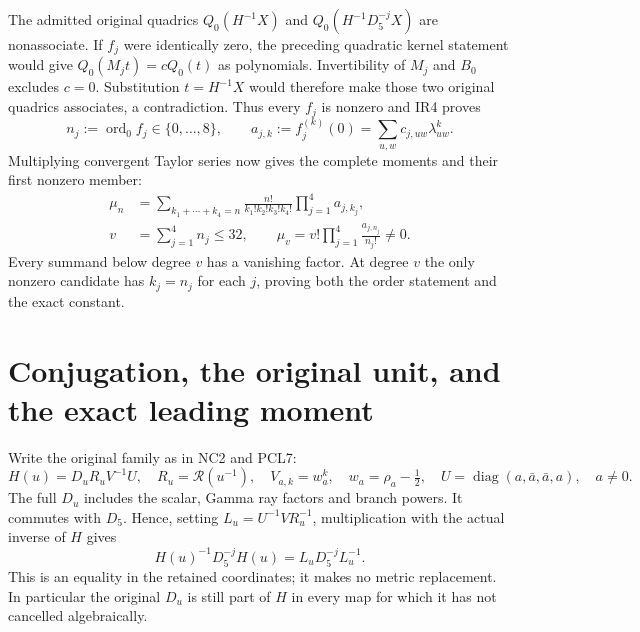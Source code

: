 \documentclass[11pt]{article}
\newcommand{\diag}{\operatorname{diag}}
\newcommand{\ord}{\operatorname{ord}}
\begin{document}
The admitted original quadrics
$Q_0(H^{-1}X)$ and $Q_0(H^{-1}D_5^{-j}X)$ are nonassociate. If $f_j$
were identically zero, the preceding quadratic kernel statement would
give $Q_0(M_jt)=cQ_0(t)$ as polynomials. Invertibility of $M_j$ and
$B_0$ excludes $c=0$. Substitution $t=H^{-1}X$ would therefore make
those two original quadrics associates, a contradiction. Thus every
$f_j$ is nonzero and IR4 proves
\[
 n_j:=\ord_0f_j\in\{0,\ldots,8\},\qquad
 a_{j,k}:=f_j^{(k)}(0)=\sum_{u,w}c_{j,uw}\lambda_{uw}^k.
 \tag{IR5}
\]
Multiplying convergent Taylor series now gives the complete moments
and their first nonzero member:
\[
 \begin{split}
 \mu_n&=\sum_{k_1+\cdots+k_4=n}
 \frac{n!}{k_1!k_2!k_3!k_4!}\prod_{j=1}^4a_{j,k_j},\\
 v&=\sum_{j=1}^4n_j\le32,\qquad
 \mu_v=v!\prod_{j=1}^4\frac{a_{j,n_j}}{n_j!}\ne0.
 \end{split}\tag{IR6}
\]
Every summand below degree $v$ has a vanishing factor. At degree $v$
the only nonzero candidate has $k_j=n_j$ for each $j$, proving both
the order statement and the exact constant.

\section{Conjugation, the original unit, and the exact leading moment}
Write the original family as in NC2 and PCL7:
\[
 H(u)=D_uR_uV^{-1}U,\quad R_u=\mathcal R(u^{-1}),\quad
 V_{a,k}=w_a^k,\quad w_a=\rho_a-\tfrac12,\quad
 U=\diag(a,\bar a,\bar a,a),\quad a\ne0.
 \tag{IR7}
\]
The full $D_u$ includes the scalar, Gamma ray factors and branch
powers. It commutes with $D_5$. Hence, setting
$L_u=U^{-1}VR_u^{-1}$, multiplication with the actual inverse of $H$
gives
\[
 H(u)^{-1}D_5^{-j}H(u)=L_uD_5^{-j}L_u^{-1}.
 \tag{IR8}
\]
This is an equality in the retained coordinates; it makes no metric
replacement. In particular the original $D_u$ is still part of $H$
in every map for which it has not cancelled algebraically.
\end{document}
